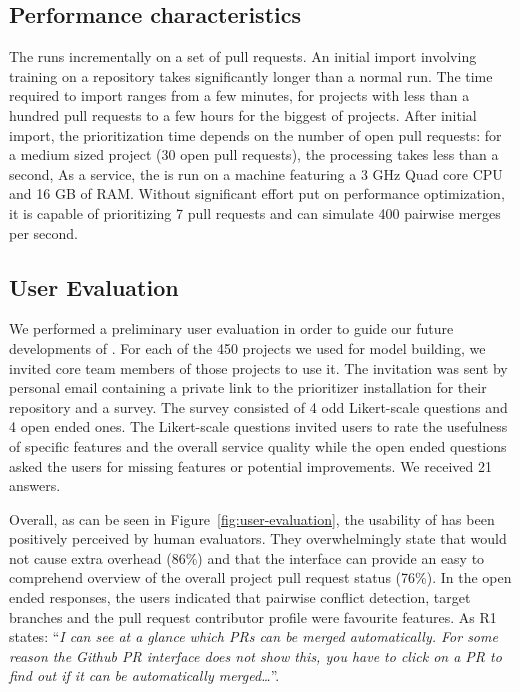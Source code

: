 \documentclass[conference]{IEEEtran}
\begin{document}
\subsection{Performance characteristics}

The \prioritizer runs incrementally on a set of pull requests. An initial import
involving training on a repository takes significantly longer than a normal run.
The time required to import ranges from a few minutes, for projects with less
than a hundred pull requests to a few hours for the biggest of projects. After
initial import, the prioritization time depends on the number of open pull
requests: for a medium sized project (30 open pull requests), the processing
takes less than a second, As a service, the \prioritizer is run on a machine
featuring a 3 GHz Quad core CPU and 16 GB of RAM. Without significant effort put
on performance optimization, it is capable of prioritizing 7 pull requests and
can simulate 400 pairwise merges per second.

\subsection{User Evaluation}

We performed a preliminary user evaluation in order to guide our future
developments of \prioritizer. For each of the 450 projects we used for
model building, we invited core team members of those projects to use it. The
invitation was sent by personal email containing a private link to the prioritizer
installation for their repository and a survey. The survey consisted of 4 odd
Likert-scale questions and 4 open ended ones. The Likert-scale questions invited
users to rate the usefulness of specific features and the overall service
quality while the open ended questions asked the users for missing features or
potential improvements. We received 21 answers.

Overall, as can be seen in Figure~\ref{fig:user-evaluation}, the usability of
\prioritizer has been positively perceived by human evaluators.  They
overwhelmingly state that \prioritizer would not cause extra overhead (86\%) and
that the \prioritizer interface can provide an easy to comprehend overview of
the overall project pull request status (76\%).  In the open ended responses,
the users indicated that pairwise conflict detection, target branches and the
pull request contributor profile were favourite features. As R1 states:
``\emph{I can see at a glance which PRs can be merged automatically. For some
reason the Github PR interface does not show this, you have to click on a PR to
find out if it can be automatically merged\ldots}''.
\end{document}
